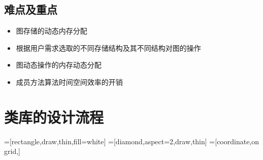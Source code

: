 \documentclass{article}
\begin{document}
\subsection{难点及重点}
\begin{itemize}
	\item 图存储的动态内存分配
	\item 根据用户需求选取的不同存储结构及其不同结构对图的操作
	\item 图动态操作的内存动态分配
	\item 成员方法算法时间空间效率的开销
\end{itemize}

\section{类库的设计流程}
	\begin{center}  
		\scriptsize  
		=[rectangle,draw,thin,fill=white]  
		=[diamond,aspect=2,draw,thin]  
		=[coordinate,on grid,]  


\end{center}
\end{document}
